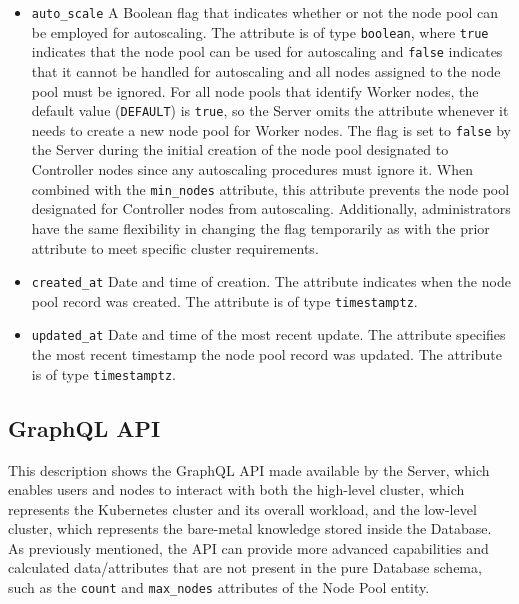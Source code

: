 \begin{itemize}
  \item \texttt{auto\_scale}
    \newline
    A Boolean flag that indicates whether or not the node pool can be employed
    for autoscaling.
    \newline
    The attribute is of type \texttt{boolean}, where \texttt{true} indicates
    that the node pool can be used for autoscaling and \texttt{false} indicates that
    it cannot be handled for autoscaling and all nodes assigned to the node pool
    must be ignored.
    \newline
    For all node pools that identify Worker nodes, the default value (\texttt{DEFAULT})
    is \texttt{true}, so the Server omits the attribute whenever it needs to
    create a new node pool for Worker nodes. The flag is set to \texttt{false}
    by the Server during the initial creation of the node pool designated to
    Controller nodes since any autoscaling procedures must ignore it.
    \newline
    When combined with the \texttt{min\_nodes} attribute, this attribute prevents
    the node pool designated for Controller nodes from autoscaling. Additionally,
    administrators have the same flexibility in changing the flag temporarily as
    with the prior attribute to meet specific cluster requirements.

  \item \texttt{created\_at}
    \newline
    Date and time of creation.
    \newline
    The attribute indicates when the node pool record was created.
    \newline
    The attribute is of type \texttt{timestamptz}.

  \item \texttt{updated\_at}
    \newline
    Date and time of the most recent update.
    \newline
    The attribute specifies the most recent timestamp the node pool record was updated.
    \newline
    The attribute is of type \texttt{timestamptz}.
\end{itemize}

\subsection{GraphQL API}
\label{subsec:implementation_server_graphql_api}

This description shows the GraphQL API made available by the Server, which
enables users and nodes to interact with both the high-level cluster, which represents
the Kubernetes cluster and its overall workload, and the low-level cluster, which
represents the bare-metal knowledge stored inside the Database. As previously
mentioned, the API can provide more advanced capabilities and calculated data/attributes
that are not present in the pure Database schema, such as the \texttt{count} and
\texttt{max\_nodes} attributes of the Node Pool entity.


